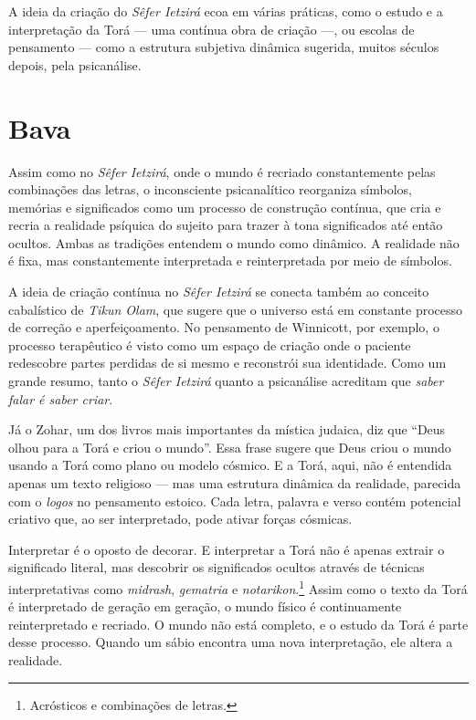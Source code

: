 {A ideia da criação do \textit{Sêfer Ietzirá} ecoa em várias práticas, como o estudo e a interpretação da Torá --- uma contínua obra de criação ---, ou escolas de pensamento --- como a estrutura subjetiva dinâmica sugerida, muitos séculos depois, pela psicanálise. 

\chapter*{Bava \smallskip{}}

\begin{center}
{\huge{}}
\end{center}

Assim como no \textit{Sêfer Ietzirá}, onde o mundo é recriado constantemente pelas combinações das letras, o inconsciente psicanalítico reorganiza símbolos, memórias e significados como um processo de construção contínua, que cria e recria a realidade psíquica do sujeito para trazer à tona significados até então ocultos. Ambas as tradições entendem o mundo como dinâmico. A realidade não é fixa, mas constantemente interpretada e reinterpretada por meio de símbolos. 

A ideia de criação contínua no \textit{Sêfer Ietzirá} se conecta também ao conceito cabalístico de \textit{Tikun Olam}, que sugere que o universo está em constante processo de correção e aperfeiçoamento. No pensamento de Winnicott, por exemplo, o processo terapêutico é visto como um espaço de criação onde o paciente redescobre partes perdidas de si mesmo e reconstrói sua identidade. Como um grande resumo, tanto o \textit{Sêfer Ietzirá} quanto a psicanálise acreditam que \textit{saber falar é saber criar}.


Já o Zohar, um dos livros mais importantes da mística judaica, diz que ``Deus olhou para a Torá e criou o mundo''. Essa frase sugere que Deus criou o mundo usando a Torá como plano ou modelo cósmico. E a Torá, aqui, não é entendida apenas um texto religioso --- mas uma estrutura dinâmica da realidade, parecida com o \textit{logos} no pensamento estoico. Cada letra, palavra e verso contém potencial criativo que, ao ser interpretado, pode ativar forças cósmicas.

Interpretar é o oposto de decorar. E interpretar a Torá não é apenas extrair o significado literal, mas descobrir os significados ocultos através de técnicas interpretativas como \textit{midrash}, \textit{gematria} e \textit{notarikon}.\footnote{Acrósticos e combinações de letras.} Assim como o texto da Torá é interpretado de geração em geração, o mundo físico é continuamente reinterpretado e recriado. O mundo não está completo, e o estudo da Torá é parte desse processo. Quando um sábio encontra uma nova interpretação, ele altera a realidade.

}
